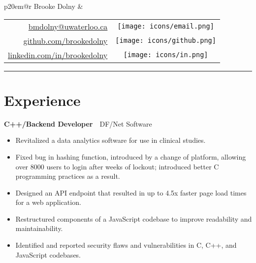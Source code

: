\documentclass[oneside, 12pt]{memoir}
\newcommand{\TitleFont}[1]{\textnormal{\fontsize{35pt}{0}\selectfont #1}}
\newcommand{\entryGeneral}[4]{
  \begin{adjustwidth}{0.3em}{0em}%
  \textbf{#1}~\cdot~#2\sourceatright{\Date \small #3}%
  \begin{adjustwidth}{0.5em}{2.0em}
    \begin{flushleft}
      {\Merriweather \small #4}%
    \end{flushleft}
  \end{adjustwidth}
  \end{adjustwidth}
  \hfill
}
\newcommand{\github}{\texttt{[image: icons/github.png]}}
\newcommand{\linkedin}{\texttt{[image: icons/in.png]}}
\newcommand{\email}{\texttt{[image: icons/email.png]}}
\newcommand{\phone}{\texttt{[image: icons/phone.png]}}
\begin{document}
\color{textcolor}

\begin{tabular*}{\textwidth}{p{20em}@{\extracolsep{\fill}}r}%
  \TitleFont{\color{titlecolor} Brooke Dolny} 
  &
  \begin{tabular}{rc}
    \url{bmdolny@uwaterloo.ca} & \email\\
    \url{github.com/brookedolny} & \github\\
    \url{linkedin.com/in/brookedolny} & \linkedin
    \vspace{-0.08em}
    \end{tabular}%
\end{tabular*}
{\color{titlecolor} \rule{\textwidth}{0.1em}}
%
\section*{Experience}

\entryGeneral{C++/Backend Developer}{DF/Net Software}{May 2018---Aug 2018}{
  \begin{itemize}
    \itemsep 0.25em
    \item{
      Revitalized a data analytics software for use in clinical studies.
    }
    \item{
      Fixed bug in hashing function, introduced by a change of platform,
      allowing over 8000 users to login after weeks of lockout; introduced
      better C programming practices as a result.
    }
    \item{
      Designed an API endpoint that resulted in up to 4.5x faster page load
      times for a web application.
    }
    \item{
      Restructured components of a JavaScript codebase to improve readability
      and maintainability.
    }
    \item{
      Identified and reported security flaws and vulnerabilities in C, C++, and
      JavaScript codebases.
    }
  \end{itemize}
}
\end{document}
